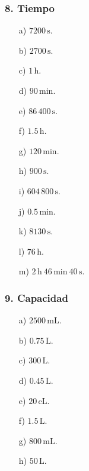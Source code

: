 \subsubsection*{8. Tiempo}
\begin{enumerate}
    \item[a)] $7200\,\mathrm{s}$.
    \item[b)] $2700\,\mathrm{s}$.
    \item[c)] $1\,\mathrm{h}$.
    \item[d)] $90\,\mathrm{min}$.
    \item[e)] $86\,400\,\mathrm{s}$.
    \item[f)] $1.5\,\mathrm{h}$.
    \item[g)] $120\,\mathrm{min}$.
    \item[h)] $900\,\mathrm{s}$.
    \item[i)] $604\,800\,\mathrm{s}$.
    \item[j)] $0.5\,\mathrm{min}$.
    \item[k)] $8130\,\mathrm{s}$.
    \item[l)] $76\,\mathrm{h}$.
    \item[m)] $2\,\mathrm{h}\ 46\,\mathrm{min}\ 40\,\mathrm{s}$.
\end{enumerate}

\subsubsection*{9. Capacidad}
\begin{enumerate}
    \item[a)] $2500\,\mathrm{mL}$.
    \item[b)] $0.75\,\mathrm{L}$.
    \item[c)] $300\,\mathrm{L}$.
    \item[d)] $0.45\,\mathrm{L}$.
    \item[e)] $20\,\mathrm{cL}$.
    \item[f)] $1.5\,\mathrm{L}$.
    \item[g)] $800\,\mathrm{mL}$.
    \item[h)] $50\,\mathrm{L}$.
\end{enumerate}

